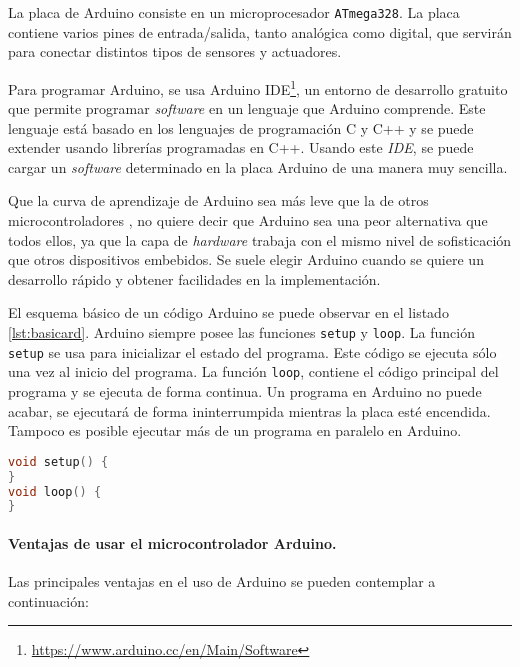 La placa de Arduino \cite{17} consiste en un microprocesador \texttt{ATmega328}. La placa contiene varios pines de entrada/salida, tanto analógica como digital, que servirán para conectar distintos tipos de sensores y actuadores.

Para programar Arduino, se usa Arduino IDE\footnote{\url{https://www.arduino.cc/en/Main/Software}}, un entorno de desarrollo gratuito que permite programar \textit{software} en un lenguaje que Arduino comprende. Este lenguaje está basado en los lenguajes de programación C y C++ y se puede extender usando librerías programadas en C++. Usando este \textit{\ac{IDE}}, se puede cargar un \textit{software} determinado en la placa Arduino de una manera muy sencilla.

Que la curva de aprendizaje de Arduino sea más leve que la de otros microcontroladores \cite{9}, no quiere decir que Arduino sea una peor alternativa que todos ellos, ya que la capa de \textit{hardware} trabaja con el mismo nivel de sofisticación que otros dispositivos embebidos. Se suele elegir Arduino cuando se quiere un desarrollo rápido y obtener facilidades en la implementación.

El esquema básico de un código Arduino se puede observar en el listado \ref{lst:basicard}. Arduino siempre posee las funciones \texttt{setup} y \texttt{loop}. La función \texttt{setup} se usa para inicializar el estado del programa. Este código se ejecuta sólo una vez al inicio del programa. La función \texttt{loop}, contiene el código principal del programa y se ejecuta de forma continua. Un programa en Arduino no puede acabar, se ejecutará de forma ininterrumpida mientras la placa esté encendida. Tampoco es posible ejecutar más de un programa en paralelo en Arduino.

\begin{lstlisting}[language=c++,captionpos=t,caption={\textbf{Esquema básico de un código Arduino.}},label={lst:basicard}]
void setup() {
}
void loop() {
}
\end{lstlisting}

\paragraph{Ventajas de usar el microcontrolador Arduino.}

Las principales ventajas en el uso de Arduino se pueden contemplar a continuación:


